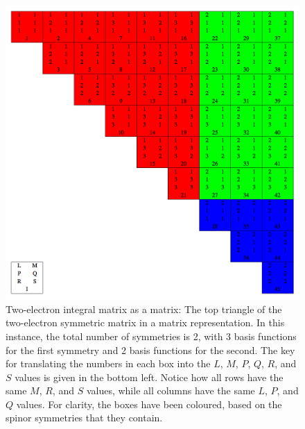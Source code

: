 \begin{figure}[h!]
\includegraphics[width=1\textwidth]{Figures/eint2_mat.png}
\caption[Two-electron integral matrix as a matrix]
{Two-electron integral matrix as a matrix: The top triangle of the two-electron symmetric matrix in a matrix representation. In this instance, the total number of symmetries is 2, with 3 basis functions for the first symmetry and 2 basis functions for the second. The key for translating the numbers in each box into the $L$, $M$, $P$, $Q$, $R$, and $S$ values is given in the bottom left. Notice how all rows have the same $M$, $R$, and $S$ values, while all columns have the same $L$, $P$, and $Q$ values. For clarity, the boxes have been coloured, based on the spinor symmetries that they contain.}
\label{fig:eint2mat}
\end{figure}

